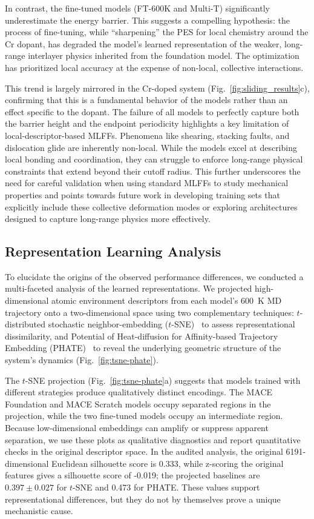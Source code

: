 \documentclass[pdflatex,sn-mathphys-num]{sn-jnl}%
\theoremstyle{thmstyleone}%
\theoremstyle{thmstyletwo}%
\theoremstyle{thmstylethree}%
\begin{document}
In contrast, the fine-tuned models (FT-600K and Multi-T) significantly underestimate the energy barrier. This suggests a compelling hypothesis: the process of fine-tuning, while ``sharpening'' the PES for local chemistry around the Cr dopant, has degraded the model's learned representation of the weaker, long-range interlayer physics inherited from the foundation model. The optimization has prioritized local accuracy at the expense of non-local, collective interactions.

This trend is largely mirrored in the Cr-doped system (Fig.~\ref{fig:sliding_results}c), confirming that this is a fundamental behavior of the models rather than an effect specific to the dopant. The failure of all models to perfectly capture both the barrier height and the endpoint periodicity highlights a key limitation of local-descriptor-based MLFFs. Phenomena like shearing, stacking faults, and dislocation glide are inherently non-local. While the models excel at describing local bonding and coordination, they can struggle to enforce long-range physical constraints that extend beyond their cutoff radius. This further underscores the need for careful validation when using standard MLFFs to study mechanical properties and points towards future work in developing training sets that explicitly include these collective deformation modes or exploring architectures designed to capture long-range physics more effectively.

\subsection{Representation Learning Analysis}

To elucidate the origins of the observed performance differences, we conducted a multi-faceted analysis of the learned representations. We projected high-dimensional atomic environment descriptors from each model's 600~K MD trajectory onto a two-dimensional space using two complementary techniques: $t$-distributed stochastic neighbor-embedding ($t$-SNE)~\citep{maaten2008visualizing} to assess representational dissimilarity, and Potential of Heat-diffusion for Affinity-based Trajectory Embedding (PHATE)~\citep{moon2019visualizing} to reveal the underlying geometric structure of the system's dynamics (Fig.~\ref{fig:tsne-phate}).

The $t$-SNE projection (Fig.~\ref{fig:tsne-phate}a) suggests that models trained with different strategies produce qualitatively distinct encodings. The MACE Foundation and MACE Scratch models occupy separated regions in the projection, while the two fine-tuned models occupy an intermediate region. Because low-dimensional embeddings can amplify or suppress apparent separation, we use these plots as qualitative diagnostics and report quantitative checks in the original descriptor space. In the audited analysis, the original 6191-dimensional Euclidean silhouette score is 0.333, while z-scoring the original features gives a silhouette score of -0.019; the projected baselines are $0.397\pm0.027$ for $t$-SNE and 0.473 for PHATE. These values support representational differences, but they do not by themselves prove a unique mechanistic cause.
\end{document}
